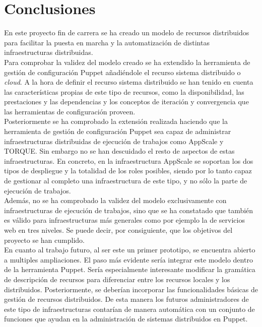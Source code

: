\chapter{Conclusiones}
\label{cap:conclusiones}


En este proyecto fin de carrera se ha creado un modelo de recursos distribuidos para facilitar la puesta en marcha y la automatización de distintas infraestructuras distribuidas. \\

Para comprobar la validez del modelo creado se ha extendido la herramienta de gestión de configuración Puppet añadiéndole el recurso sistema distribuido o \emph{cloud}. A la hora de definir el recurso sistema distribuido se han tenido en cuenta las características propias de este tipo de recursos, como la disponibilidad, las prestaciones y las dependencias y los conceptos de iteración y convergencia que las herramientas de configuración proveen. \\

Posteriormente se ha comprobado la extensión realizada haciendo que la herramienta de gestión de configuración Puppet sea capaz de administrar infraestructuras distribuidas de ejecución de trabajos como AppScale y TORQUE. Sin embargo no se han descuidado el resto de aspectos de estas infraestructuras. En concreto, en la infraestructura AppScale se soportan los dos tipos de despliegue y la totalidad de los roles posibles, siendo por lo tanto capaz de gestionar al completo una infraestructura de este tipo, y no sólo la parte de ejecución de trabajos. \\

Además, no se ha comprobado la validez del modelo exclusivamente con infraestructuras de ejecución de trabajos, sino que se ha constatado que también es válido para infraestructuras más generales como por ejemplo la de servicios web en tres niveles. Se puede decir, por consiguiente, que los objetivos del proyecto se han cumplido. \\

En cuanto al trabajo futuro, al ser este un primer prototipo, se encuentra abierto a multiples ampliaciones. El paso más evidente sería integrar este modelo dentro de la herramienta Puppet. Sería especialmente interesante modificar la gramática de descripción de recursos para diferenciar entre los recursos locales y los distribuidos. Posteriormente, se deberían incorporar las funcionalidades básicas de gestión de recursos distribuidos. De esta manera los futuros administradores de este tipo de infraestructuras contarían de manera automática con un conjunto de funciones que ayudan en la administración de sistemas distribuidos en Puppet.

